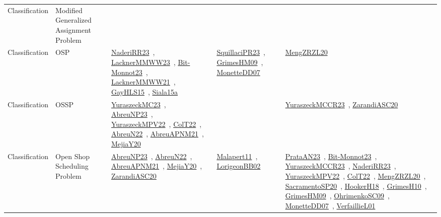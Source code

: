 {\begin{longtable}{lp{3cm}>{\raggedright\arraybackslash}p{6cm}>{\raggedright\arraybackslash}p{6cm}>{\raggedright\arraybackslash}p{8cm}}
Classification & Modified Generalized Assignment Problem &  &  & \\
Classification & OSP & \href{works/NaderiRR23.pdf}{NaderiRR23}~\cite{NaderiRR23}, \href{works/LacknerMMWW23.pdf}{LacknerMMWW23}~\cite{LacknerMMWW23}, \href{works/Bit-Monnot23.pdf}{Bit-Monnot23}~\cite{Bit-Monnot23}, \href{works/LacknerMMWW21.pdf}{LacknerMMWW21}~\cite{LacknerMMWW21}, \href{works/GayHLS15.pdf}{GayHLS15}~\cite{GayHLS15}, \href{works/Siala15a.pdf}{Siala15a}~\cite{Siala15a} & \href{works/SquillaciPR23.pdf}{SquillaciPR23}~\cite{SquillaciPR23}, \href{works/GrimesHM09.pdf}{GrimesHM09}~\cite{GrimesHM09}, \href{works/MonetteDD07.pdf}{MonetteDD07}~\cite{MonetteDD07} & \href{works/MengZRZL20.pdf}{MengZRZL20}~\cite{MengZRZL20}\\
Classification & OSSP & \href{works/YuraszeckMC23.pdf}{YuraszeckMC23}~\cite{YuraszeckMC23}, \href{works/AbreuNP23.pdf}{AbreuNP23}~\cite{AbreuNP23}, \href{works/YuraszeckMPV22.pdf}{YuraszeckMPV22}~\cite{YuraszeckMPV22}, \href{works/ColT22.pdf}{ColT22}~\cite{ColT22}, \href{works/AbreuN22.pdf}{AbreuN22}~\cite{AbreuN22}, \href{works/AbreuAPNM21.pdf}{AbreuAPNM21}~\cite{AbreuAPNM21}, \href{works/MejiaY20.pdf}{MejiaY20}~\cite{MejiaY20} &  & \href{works/YuraszeckMCCR23.pdf}{YuraszeckMCCR23}~\cite{YuraszeckMCCR23}, \href{works/ZarandiASC20.pdf}{ZarandiASC20}~\cite{ZarandiASC20}\\
Classification & Open Shop Scheduling Problem & \href{works/AbreuNP23.pdf}{AbreuNP23}~\cite{AbreuNP23}, \href{works/AbreuN22.pdf}{AbreuN22}~\cite{AbreuN22}, \href{works/AbreuAPNM21.pdf}{AbreuAPNM21}~\cite{AbreuAPNM21}, \href{works/MejiaY20.pdf}{MejiaY20}~\cite{MejiaY20}, \href{works/ZarandiASC20.pdf}{ZarandiASC20}~\cite{ZarandiASC20} & \href{works/Malapert11.pdf}{Malapert11}~\cite{Malapert11}, \href{works/LorigeonBB02.pdf}{LorigeonBB02}~\cite{LorigeonBB02} & \href{works/PrataAN23.pdf}{PrataAN23}~\cite{PrataAN23}, \href{works/Bit-Monnot23.pdf}{Bit-Monnot23}~\cite{Bit-Monnot23}, \href{works/YuraszeckMCCR23.pdf}{YuraszeckMCCR23}~\cite{YuraszeckMCCR23}, \href{works/NaderiRR23.pdf}{NaderiRR23}~\cite{NaderiRR23}, \href{works/YuraszeckMPV22.pdf}{YuraszeckMPV22}~\cite{YuraszeckMPV22}, \href{works/ColT22.pdf}{ColT22}~\cite{ColT22}, \href{works/MengZRZL20.pdf}{MengZRZL20}~\cite{MengZRZL20}, \href{works/SacramentoSP20.pdf}{SacramentoSP20}~\cite{SacramentoSP20}, \href{works/HookerH18.pdf}{HookerH18}~\cite{HookerH18}, \href{works/GrimesH10.pdf}{GrimesH10}~\cite{GrimesH10}, \href{works/GrimesHM09.pdf}{GrimesHM09}~\cite{GrimesHM09}, \href{works/OhrimenkoSC09.pdf}{OhrimenkoSC09}~\cite{OhrimenkoSC09}, \href{works/MonetteDD07.pdf}{MonetteDD07}~\cite{MonetteDD07}, \href{works/VerfaillieL01.pdf}{VerfaillieL01}~\cite{VerfaillieL01}\\

\end{longtable}}
